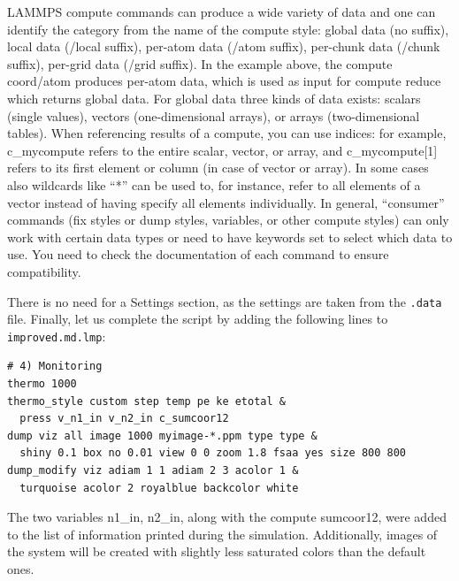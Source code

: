\documentclass[9pt,tutorial]{livecoms}
\newcommand{\lmpcmd}[1]{\colorbox{listing}{\textcolor{command}{\small{#1}}}} %
\newcommand{\flecmd}[1]{\textcolor{command}{\texttt{#1}}} %
\begin{document}
\begin{note}
  LAMMPS \lmpcmd{compute} commands can produce
  a wide variety of data and one can identify the category from the
  name of the compute style: global data (no suffix), local data
  (/local suffix), per-atom data (/atom suffix), per-chunk data
  (/chunk suffix), per-grid data (/grid suffix).  In the example
  above, the \lmpcmd{compute coord/atom} produces per-atom data, which
  is used as input for \lmpcmd{compute reduce} which returns global
  data.  For global data three kinds of data exists: scalars (single
  values), vectors (one-dimensional arrays), or arrays
  (two-dimensional tables).  When referencing results of a compute,
  you can use indices: for example, \lmpcmd{c\_mycompute} refers to
  the entire scalar, vector, or array, and \lmpcmd{c\_mycompute[1]}
  refers to its first element or column (in case of vector or array).  In some
  cases also wildcards like ``*'' can be used to, for instance, refer to all elements
  of a vector instead of having specify all elements individually.
  In general, ``consumer'' commands (\lmpcmd{fix} styles or \lmpcmd{dump} styles,
  \lmpcmd{variables}, or other \lmpcmd{compute} styles) can only work with certain data
  types or need to have keywords set to select which data to use.
  You need to check the documentation of each command to ensure
  compatibility.
\end{note}

There is no need for a \lmpcmd{Settings} section, as the settings are
taken from the \flecmd{.data} file.
Finally, let us complete the script by adding the following lines to
\flecmd{improved.md.lmp}:
\begin{lstlisting}
# 4) Monitoring
thermo 1000
thermo_style custom step temp pe ke etotal &
  press v_n1_in v_n2_in c_sumcoor12
dump viz all image 1000 myimage-*.ppm type type &
  shiny 0.1 box no 0.01 view 0 0 zoom 1.8 fsaa yes size 800 800
dump_modify viz adiam 1 1 adiam 2 3 acolor 1 &
  turquoise acolor 2 royalblue backcolor white
\end{lstlisting}
The two variables \lmpcmd{n1\_in}, \lmpcmd{n2\_in}, along with the compute
\lmpcmd{sumcoor12}, were added to the list of information printed during
the simulation.  Additionally, images of the system will be created with
slightly less saturated colors than the default ones.
\end{document}
